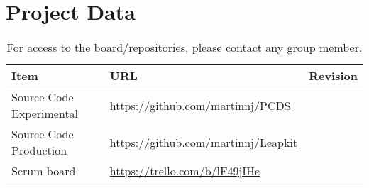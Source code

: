 \section{Project Data}

\begin{table}[h!]
    \begin{tabular}{l|l|l}
        \textbf{Item}            & \textbf{URL}                              & \textbf{Revision}\\\hline
        Source Code Experimental & \url{https://github.com/martinnj/PCDS}    & \texttt{}\\
        Source Code Production   & \url{https://github.com/martinnj/Leapkit} & \texttt{}\\
        Scrum board              & \url{https://trello.com/b/lF49jIHe}       & \texttt{}
    \end{tabular}
    \label{tab:projdata}
    \caption{For access to the board/repositories, please contact any group member.}
\end{table}

